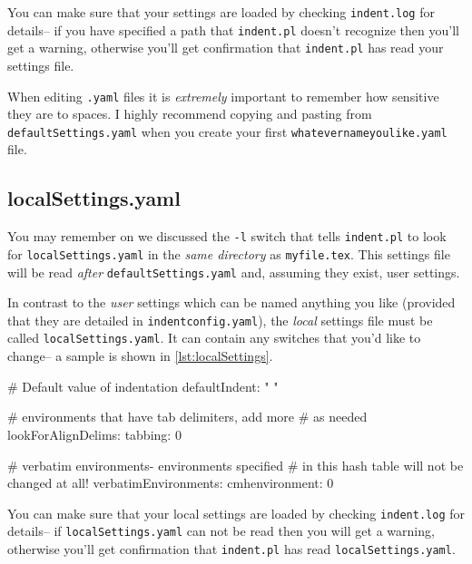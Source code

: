  	You can make sure that your settings are loaded by checking \lstinline!indent.log!
 	for details-- if you have specified a path that \lstinline!indent.pl! doesn't 
 	recognize then you'll get a warning, otherwise you'll get confirmation that 
 	\lstinline!indent.pl! has read your settings file.
 	 	
 	 	
 	\begin{warning}
 		When editing \lstinline!.yaml! files it is \emph{extremely} important 
 		to remember how sensitive they are to spaces. I highly recommend copying 
 		and pasting from \lstinline!defaultSettings.yaml! when you create your
 		first \lstinline!whatevernameyoulike.yaml! file.
 	\end{warning}
 	 	
 \subsection{localSettings.yaml}
 	You may remember on  we discussed the \lstinline!-l! switch
 	that tells \lstinline!indent.pl! to look for \lstinline!localSettings.yaml! in the 
 	\emph{same directory} as \lstinline!myfile.tex!. This settings file will 
 	be read \emph{after} \lstinline!defaultSettings.yaml! and, assuming they exist, 
 	user settings. 
 	 	
 	In contrast to the \emph{user} settings which can be named anything you like (provided that
 	they are detailed in \lstinline!indentconfig.yaml!), the \emph{local} settings file
 	must be called \lstinline!localSettings.yaml!. It can contain any switches that you'd
 	like to change-- a sample is shown in \cref{lst:localSettings}.
 	 	
 	\begin{yaml}[caption={\lstinline!localSettings.yaml! (example)},label={lst:localSettings}]
# Default value of indentation
defaultIndent: " "

# environments that have tab delimiters, add more 
# as needed
lookForAlignDelims:
   tabbing: 0

#  verbatim environments- environments specified 
#  in this hash table will not be changed at all!
verbatimEnvironments:
    cmhenvironment: 0
 	\end{yaml}
 	 	
 	You can make sure that your local settings are loaded by checking \lstinline!indent.log!
 	for details-- if \lstinline!localSettings.yaml! can not be read then you will
 	get a warning, otherwise you'll get confirmation that 
 	\lstinline!indent.pl! has read \lstinline!localSettings.yaml!.
 	 	

